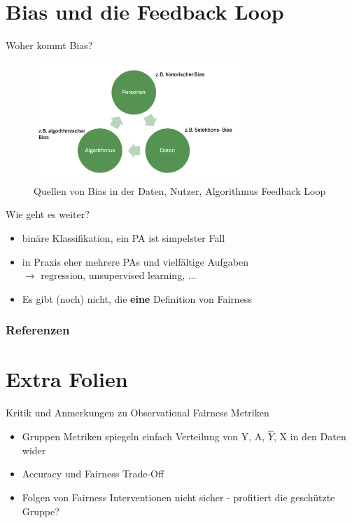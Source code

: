 \documentclass[aspectratio=169]{beamer}
\begin{document}
\section{Bias und die Feedback Loop}
\begin{frame}{Woher kommt Bias?}
	\begin{figure}
		\centering
		\includegraphics[width=0.7\textwidth]{../figures/bias_loop.png}
		\caption{Quellen von Bias in der Daten, Nutzer, Algorithmus Feedback Loop \cite{mehrabi2022}}
	\end{figure}
\end{frame}

\begin{frame}{Wie geht es weiter?}
	\begin{itemize}
		\item<1-> binäre Klassifikation, ein PA ist simpelster Fall
		\item<2-> in Praxis eher mehrere PAs und vielfältige Aufgaben\\ $\rightarrow$ regression, unsupervised learning, ...
		\item<3-> Es gibt (noch) nicht, die \textbf{eine} Definition von Fairness
	\end{itemize}
\end{frame}

\begin{frame}[allowframebreaks]
	\frametitle{Referenzen}
	\printbibliography
\end{frame}

\section{Extra Folien}

\begin{frame}{Kritik und Anmerkungen zu Observational Fairness Metriken}
	\begin{itemize}
		\item Gruppen Metriken spiegeln einfach Verteilung von Y, A, $\hat{Y}$, X in den Daten wider \cite{corbett-davies}
		\item Accuracy und Fairness Trade-Off
		\item Folgen von Fairness Interventionen nicht sicher - profitiert die geschützte Gruppe?
	\end{itemize}
\end{frame}
\end{document}
